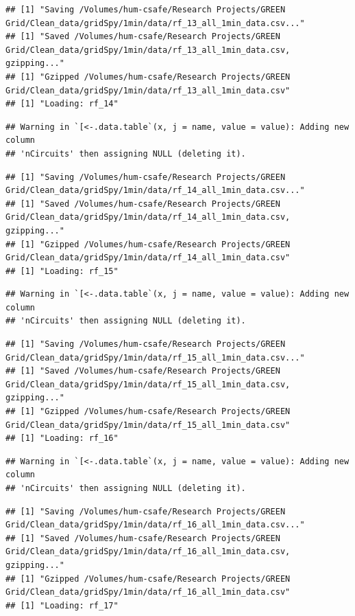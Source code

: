 \documentclass[]{article}
\begin{document}
\begin{verbatim}
## [1] "Saving /Volumes/hum-csafe/Research Projects/GREEN Grid/Clean_data/gridSpy/1min/data/rf_13_all_1min_data.csv..."
## [1] "Saved /Volumes/hum-csafe/Research Projects/GREEN Grid/Clean_data/gridSpy/1min/data/rf_13_all_1min_data.csv, gzipping..."
## [1] "Gzipped /Volumes/hum-csafe/Research Projects/GREEN Grid/Clean_data/gridSpy/1min/data/rf_13_all_1min_data.csv"
## [1] "Loading: rf_14"
\end{verbatim}

\begin{verbatim}
## Warning in `[<-.data.table`(x, j = name, value = value): Adding new column
## 'nCircuits' then assigning NULL (deleting it).
\end{verbatim}

\begin{verbatim}
## [1] "Saving /Volumes/hum-csafe/Research Projects/GREEN Grid/Clean_data/gridSpy/1min/data/rf_14_all_1min_data.csv..."
## [1] "Saved /Volumes/hum-csafe/Research Projects/GREEN Grid/Clean_data/gridSpy/1min/data/rf_14_all_1min_data.csv, gzipping..."
## [1] "Gzipped /Volumes/hum-csafe/Research Projects/GREEN Grid/Clean_data/gridSpy/1min/data/rf_14_all_1min_data.csv"
## [1] "Loading: rf_15"
\end{verbatim}

\begin{verbatim}
## Warning in `[<-.data.table`(x, j = name, value = value): Adding new column
## 'nCircuits' then assigning NULL (deleting it).
\end{verbatim}

\begin{verbatim}
## [1] "Saving /Volumes/hum-csafe/Research Projects/GREEN Grid/Clean_data/gridSpy/1min/data/rf_15_all_1min_data.csv..."
## [1] "Saved /Volumes/hum-csafe/Research Projects/GREEN Grid/Clean_data/gridSpy/1min/data/rf_15_all_1min_data.csv, gzipping..."
## [1] "Gzipped /Volumes/hum-csafe/Research Projects/GREEN Grid/Clean_data/gridSpy/1min/data/rf_15_all_1min_data.csv"
## [1] "Loading: rf_16"
\end{verbatim}

\begin{verbatim}
## Warning in `[<-.data.table`(x, j = name, value = value): Adding new column
## 'nCircuits' then assigning NULL (deleting it).
\end{verbatim}

\begin{verbatim}
## [1] "Saving /Volumes/hum-csafe/Research Projects/GREEN Grid/Clean_data/gridSpy/1min/data/rf_16_all_1min_data.csv..."
## [1] "Saved /Volumes/hum-csafe/Research Projects/GREEN Grid/Clean_data/gridSpy/1min/data/rf_16_all_1min_data.csv, gzipping..."
## [1] "Gzipped /Volumes/hum-csafe/Research Projects/GREEN Grid/Clean_data/gridSpy/1min/data/rf_16_all_1min_data.csv"
## [1] "Loading: rf_17"
\end{verbatim}
\end{document}

